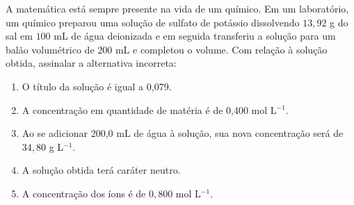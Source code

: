 A matemática está sempre presente na vida de um químico. Em um laboratório, um químico preparou uma solução de sulfato de potássio dissolvendo $13,92$ g do sal em $100$ mL de água deionizada e em seguida transferiu a solução para um balão volumétrico de $200$ mL e completou o volume. Com relação à solução obtida, assinalar a alternativa incorreta:

\begin{enumerate}[label = (\alph*)]
	\item O título da solução é igual a 0,079. 
	\item A concentração em quantidade de matéria é de 0,400 mol L$^{-1}$. 
	\item Ao se adicionar 200,0 mL de água à solução, sua nova concentração será de $34,80$ g L$^{-1}$. 
	\item A solução obtida terá caráter neutro. 
	\item A concentração dos íons  é de $0,800$ mol L$^{-1}$.
\end{enumerate}
